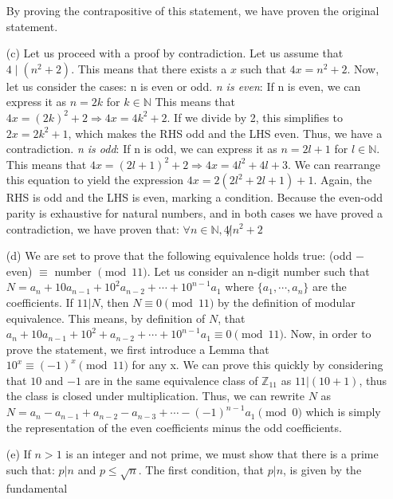 \documentclass[11pt]{article}
\begin{document}
\begin{itemize}
    By proving the contrapositive of this statement, we have proven the original statement.
  \item[(c)]
    Let us proceed with a proof by contradiction. Let us assume that $4 \mid (n^{2} + 2)$. This
    means that there exists a $x$ such that $4x = n^{2} +2$. Now, let us consider the
    cases: n is even or odd. 
    \newline \textit{n is even}: If n is even, we can express it as $n=2k$ for $k\in \mathbb{N}$
    This means that $4x = (2k)^{2} +2 \Rightarrow 4x = 4k^{2} +2$. If we divide by 2, this
    simplifies to $2x = 2k^{2} +1$, which makes the RHS odd and the LHS even.
    Thus, we have a contradiction.
    \newline \textit{n is odd}: If n is odd, we can express it as $n=2l +1$ for $l \in \mathbb{N}$.
    This means that $4x = (2l+1)^{2} +2 \Rightarrow 4x = 4l^{2} + 4l + 3$. We can rearrange this
    equation to yield the expression $4x  = 2(2l^{2} + 2l + 1) +1$. Again, the RHS is odd and the 
    LHS is even, marking a condition.
    \newline Because the even-odd parity is exhaustive for natural numbers, and in both cases
    we have proved a contradiction, we have proven that: $\forall n \in \mathbb{N}, 
    4 \not| n^{2} + 2$
  \item[(d)]
    We are set to prove that the following equivalence holds true: (odd $-$ even) $\equiv$ number 
    $\pmod{11}$. Let us consider an n-digit number such that $ N = a_{n} + 10a_{n-1} + 10^{2}
    a_{n-2} + \cdots + 10^{n-1}a_{1}$ where $\{ a_{1}, \cdots, a_{n}\}$ are the coefficients. If
    $ 11 | N$, then $N \equiv 0 \pmod{11}$ by the definition of modular equivalence. This means,
    by definition of $N$, that  $a_{n} + 10a_{n-1} + 10^{2}+  a_{n-2} + \cdots + 10^{n-1}a_{1} 
    \equiv 0 \pmod{11}$. Now, in order to prove the statement, we first introduce a Lemma that 
    $10^{x} \equiv (-1)^{x} \pmod {11}$ for any x. We can prove this quickly by considering that 
    $10$ and $-1$ are in the same equivalence class of $\mathbb{Z}_{11}$ as $11 | (10 + 1)$, thus 
    the class is closed under multiplication. Thus, we can rewrite $N$ as 
    $ N = a_{n} - a_{n-1} + a_{n-2} - a_{n-3} + \cdots - (-1)^{n-1}a_{1} \pmod{0}$ which is simply
    the representation of the even coefficients minus the odd coefficients.\cite{AOPS}
  \item[(e)] 
    If $n > 1$ is an integer and not prime, we must show that there is a prime such that:
    $p|n$ and $p \leq \sqrt{n}$. The first condition, that $p|n$, is given by the fundamental 

\end{itemize}
\end{document}
